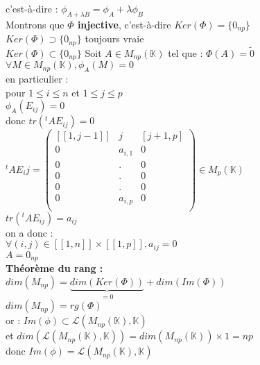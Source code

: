 \documentclass{article}
\begin{document}
c'est-à-dire : $\phi_{A+ \lambda B}=\phi_A + \lambda \phi_B$ \\
Montrons que {\bf \boldmath $\Phi$ injective}, c'est-à-dire $Ker(\Phi)= \lbrace 0_{np}\rbrace $ \\
$Ker( \Phi) \supset  \lbrace 0_{np}\rbrace$ toujours vraie \\
$Ker( \Phi) \subset  \lbrace 0_{np}\rbrace$ Soit $A \in M_{np}(\mathbb K)$ tel que : $\Phi(A)=\tilde{0}$ \\
$\forall M \in M_{np}(\mathbb K), \phi_A(M)=0$ \\
en particulier : \\
pour $1 \leq i \leq n$ et $1 \leq j \leq p$ \\
$\phi_A(E_{ij})=0$ \\
donc $tr({}^t A E_{ij})=0$ \\
${}^t A E_ij = \begin{pmatrix}
[[1, j-1]] & j & [j+1, p] \\
0	& a_{i,1} &0 \\
0	& . & 0\\
0	& . & 0\\
0	& . & 0\\
0	& a_{i,p} & 0 \\
\end{pmatrix} \in M_p( \mathbb K) $ \\
$tr({}^t A E_{ij})= a_{ij}$ \\
on a donc : \\
$\forall (i,j) \in [[1,n]] \times [[1,p]], a_{ij}= 0$ \\
$A= 0_{np}$ \\
{ \bf Théorème du rang :} \\
$dim(M_{np})=\underbrace{dim(Ker(\Phi))}_{=0}+ dim (Im(\Phi))$ \\
$dim(M_{np})= rg(\Phi)$ \\
or : $Im( \phi) \subset  \mathcal L(M_{np}(\mathbb K), \mathbb K)$ \\
et $dim( \mathcal L(M_{np}(\mathbb K), \mathbb K))= dim( M_{np}(\mathbb K)) \times 1 =np$ \\
donc $Im(\phi)=  \mathcal L(M_{np}(\mathbb K), \mathbb K)$
\end{document}

